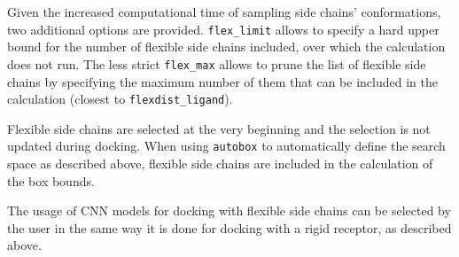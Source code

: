 \documentclass[journal=jcisd8,manuscript=article]{achemso}
\begin{document}
Given the increased computational time of sampling side chains' conformations, two additional options are provided. \texttt{flex\_limit} allows to specify a hard upper bound for the number of flexible side chains included, over which the calculation does not run. The less strict \texttt{flex\_max} allows to prune the list of flexible side chains by specifying the maximum number of them that can be included in the calculation (closest to \texttt{flexdist\_ligand}).

Flexible side chains are selected at the very beginning and the selection is not updated during docking. When using \texttt{autobox} to automatically define the search space as described above, flexible side chains are included in the calculation of the box bounds.

The usage of CNN models for docking with flexible side chains can be selected by the user in the same way it is done for docking with a rigid receptor, as described above.
\end{document}
